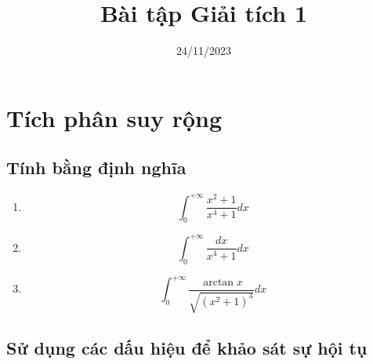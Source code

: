 \documentclass{article}
\title{Bài tập Giải tích 1}
\date{24/11/2023}
\begin{document}
\maketitle
\section{Tích phân suy rộng}
\subsection{Tính bằng định nghĩa}
\begin{enumerate}
    \item $$\int_{0}^{+\infty}\frac{x^2+1}{x^4+1}dx$$
    \item $$\int_{0}^{+\infty}\frac{dx}{x^4+1}dx$$
    \item $$\int_{0}^{+\infty}\frac{\arctan x}{\sqrt{(x^2+1)^3}}dx$$
\end{enumerate}
\subsection{Sử dụng các dấu hiệu để khảo sát sự hội tụ}
\end{document}
